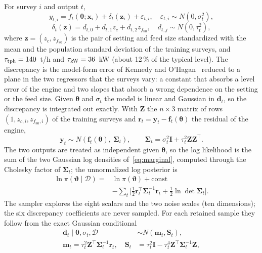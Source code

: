 \documentclass[journal]{IEEEtran}
\newcommand{\pct}{\,\%}
\begin{document}
For survey $i$ and output $t$,
\begin{equation}
y_{t,i}=f_t(\boldsymbol\theta;\mathbf x_i)+\delta_t(\mathbf z_i)+\varepsilon_{t,i},\quad \varepsilon_{t,i}\sim N(0,\sigma_t^2),
\label{eq:model}
\end{equation}
\begin{equation}
\delta_t(\mathbf z)=d_{t,0}+d_{t,1}z_{c}+d_{t,2}z_{f_{80}},\quad d_{t,j}\sim N(0,\tau_t^2),
\label{eq:disc}
\end{equation}
where $\mathbf z=(z_c,z_{f_{80}})$ is the pair of setting and feed size standardized with the mean and the population
standard deviation of the training surveys, and $\tau_{\mathrm{tph}}=140$~t/h and $\tau_{\mathrm{kW}}=36$~kW (about
12\pct{} of the typical level). The discrepancy is the model-form error of Kennedy and O'Hagan~\cite{ko} reduced to a plane in
the two regressors that the surveys vary: a constant that absorbs a level error of the engine and two slopes that absorb
a wrong dependence on the setting or the feed size. Given $\boldsymbol\theta$ and $\sigma_t$ the model is linear and
Gaussian in $\mathbf d_t$, so the discrepancy is integrated out exactly. With $\mathbf Z$ the $n\times3$ matrix of rows
$(1,z_{c,i},z_{f_{80},i})$ of the training surveys and $\mathbf r_t=\mathbf y_t-\mathbf f_t(\boldsymbol\theta)$ the residual
of the engine,
\begin{equation}
\mathbf y_t\sim N\!\left(\mathbf f_t(\boldsymbol\theta),\ \boldsymbol\Sigma_t\right),\qquad
\boldsymbol\Sigma_t=\sigma_t^2\mathbf I+\tau_t^2\mathbf Z\mathbf Z^{\top}.
\label{eq:marginal}
\end{equation}
The two outputs are treated as independent given $\boldsymbol\theta$, so the log likelihood is the sum of the two Gaussian
log densities of~\eqref{eq:marginal}, computed through the Cholesky factor of $\boldsymbol\Sigma_t$; the unnormalized log
posterior is
\begin{align}
\ln\pi(\boldsymbol\vartheta\mid\mathcal D)={}&\ln\pi(\boldsymbol\vartheta)+\text{const}\nonumber\\
&-\sum_t\Big[\tfrac12\mathbf r_t^{\top}\boldsymbol\Sigma_t^{-1}\mathbf r_t+\tfrac12\ln\det\boldsymbol\Sigma_t\Big].
\label{eq:posterior}
\end{align}
The sampler explores the eight scalars and the two noise scales (ten dimensions); the six discrepancy coefficients are never
sampled. For each retained sample they follow from the exact Gaussian conditional
\begin{align}
\mathbf d_t\mid\boldsymbol\theta,\sigma_t,\mathcal D&\sim N(\mathbf m_t,\mathbf S_t),\nonumber\\
\mathbf m_t=\tau_t^2\mathbf Z^{\top}\boldsymbol\Sigma_t^{-1}\mathbf r_t,\quad
\mathbf S_t&=\tau_t^2\mathbf I-\tau_t^4\mathbf Z^{\top}\boldsymbol\Sigma_t^{-1}\mathbf Z,
\label{eq:conditional}
\end{align}
\end{document}
